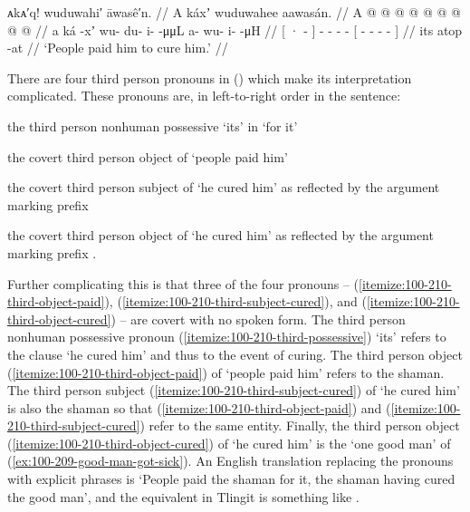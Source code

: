 \ex\label{ex:100-210-paid-to-cure}%
%
\begingl
	\glpreamble	ᴀkᴀ′q! wuduwahi′ āwasê′n. //
	\glpreamble	A káxʼ wuduwahee aawasán. //
	\gla	{} A  @ {} {}
		 @ {} @ {} @ {} @ {}
		{}  @ {} @ {} @ {} @ {} {} //
	\glb	{} a ká -xʼ {}
		wu- du- i-  -μμL
		{} a- wu- i-  -μH {} //
	\glc	{}[ ·  - {}]
		- - -  -
		{}[ - - -  - {}] //
	\gld	{} its atop -at {}
		 {} {} {} {}
		{}  {} {} {} {} //
	\glft	‘People paid him to cure him.’
		//
\endgl
\xe

There are four third person pronouns in (\lastx) which make its interpretation complicated.
These pronouns are, in left-to-right order in the sentence:
\begin{inlineenum}[label=(\alph*), ref=\alph*]
\item\label{itemize:100-210-third-possessive}%
		the third person nonhuman possessive  ‘its’ in  ‘for it’
\item\label{itemize:100-210-third-object-paid}%
		the covert third person object of  ‘people paid him’
\item\label{itemize:100-210-third-subject-cured}%
		the covert third person subject of  ‘he cured him’
		as reflected by the argument marking prefix 
\item\label{itemize:100-210-third-object-cured}%
		the covert third person object of  ‘he cured him’
		as reflected by the argument marking prefix .
\end{inlineenum}
Further complicating this is that three of the four pronouns – (\ref{itemize:100-210-third-object-paid}), (\ref{itemize:100-210-third-subject-cured}), and (\ref{itemize:100-210-third-object-cured}) – are covert with no spoken form.
The third person nonhuman possessive pronoun (\ref{itemize:100-210-third-possessive})  ‘its’ refers to the clause  ‘he cured him’ and thus to the event of curing.
The third person object (\ref{itemize:100-210-third-object-paid}) of  ‘people paid him’ refers to the shaman.
The third person subject (\ref{itemize:100-210-third-subject-cured}) of  ‘he cured him’ is also the shaman so that (\ref{itemize:100-210-third-object-paid}) and (\ref{itemize:100-210-third-subject-cured}) refer to the same entity.
Finally, the third person object (\ref{itemize:100-210-third-object-cured}) of  ‘he cured him’ is the  ‘one good man’ of (\ref{ex:100-209-good-man-got-sick}).
An English translation replacing the pronouns with explicit phrases is ‘People paid the shaman for it, the shaman having cured the good man’, and the equivalent in Tlingit is something like .

